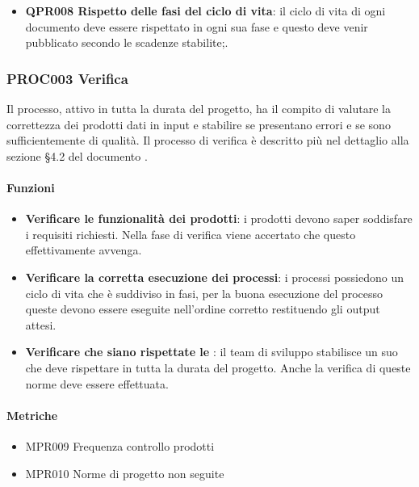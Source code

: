		\begin{itemize}
			\item \textbf{QPR008 Rispetto delle fasi del ciclo di vita}: il ciclo di vita di ogni documento deve essere rispettato in ogni sua fase e questo deve venir pubblicato secondo le scadenze stabilite;.
		\end{itemize}
	
	\subsubsection{PROC003 Verifica}
	Il processo, attivo in tutta la durata del progetto, ha il compito di valutare la correttezza dei prodotti dati in input e stabilire se presentano errori e se sono sufficientemente di qualità. Il processo di verifica è descritto più nel dettaglio alla sezione §4.2 del documento \NdPv.
	
		\paragraph*{Funzioni}
		
		\begin{itemize}
			\item \textbf{Verificare le funzionalità dei prodotti}: i prodotti devono saper soddisfare i requisiti richiesti. Nella fase di verifica viene accertato che questo effettivamente avvenga.
			\item \textbf{Verificare la corretta esecuzione dei processi}: i processi possiedono un ciclo di vita che è suddiviso in fasi, per la buona esecuzione del processo queste devono essere eseguite nell'ordine corretto restituendo gli output attesi.
			\item \textbf{Verificare che siano rispettate le \NdP}: il team di sviluppo stabilisce un suo  che deve rispettare in tutta la durata del progetto. Anche la verifica di queste norme deve essere effettuata.
		\end{itemize}
		
		\paragraph*{Metriche}
		
		\begin{itemize}
			\item MPR009 Frequenza controllo prodotti
			\item MPR010 Norme di progetto non seguite
		\end{itemize}
		
